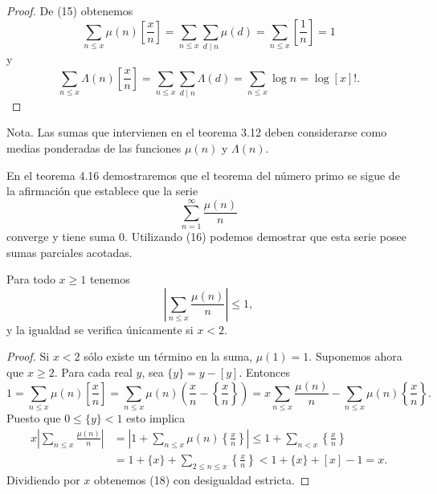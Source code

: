 \documentclass[12pt,a4paper]{book}
\begin{document}
    \begin{proof}
        De (15) obtenemos
        \begin{equation*}
            \sum_{n\leq x}\mu(n)\left[\frac{x}{n}\right]=\sum_{n\leq x}\sum_{d\mid n}\mu(d)
            =\sum_{n\leq x}\left[\frac{1}{n}\right]=1
        \end{equation*}
        y
        \begin{equation*}
            \sum_{n\leq x}\Lambda(n)\left[\frac{x}{n}\right]=\sum_{n\leq x}\sum_{d\mid n}\Lambda(d)
            =\sum_{n\leq x}\log n=\log[x]!.
        \end{equation*}
    \end{proof}

    Nota. Las sumas que intervienen en el teorema 3.12 deben considerarse como medias
    ponderadas de las funciones $\mu(n)$ y $\Lambda(n)$.

    En el teorema 4.16 demostraremos que el teorema del número primo se sigue de la
    afirmación que establece que la serie
    \begin{equation*}
        \sum_{n=1}^{\infty}\frac{\mu(n)}{n}
    \end{equation*}
    converge y tiene suma 0. Utilizando (16) podemos demostrar que esta serie posee sumas
    parciales acotadas.

    \begin{teorema}
        Para todo $x\geq1$ tenemos
        \begin{equation}
            \left|\sum_{n\leq x}\frac{\mu(n)}{n}\right|\leq1,
        \end{equation}
        y la igualdad se verifica únicamente si $x<2$.
    \end{teorema}

    \begin{proof}
        Si $x<2$ sólo existe un término en la suma, $\mu(1)=1$. Suponemos ahora que
        $x\geq2$. Para cada real $y$, sea $\{y\}=y-[y]$. Entonces
        \begin{equation*}
            1=\sum_{n\leq x}\mu(n)\left[\frac{x}{n}\right]
            =\sum_{n\leq x}\mu(n)\left(\frac{x}{n}-\left\{\frac{x}{n}\right\}\right)
            =x\sum_{n\leq x}\frac{\mu(n)}{n}-\sum_{n\leq x}\mu(n)\left\{\frac{x}{n}\right\}.
        \end{equation*}
        Puesto que $0\leq\{y\}<1$ esto implica
        \begin{align*}
            x\left|\sum_{n\leq x}\frac{\mu(n)}{n}\right|&=\left|1+\sum_{n\leq x}\mu(n)\left\{\frac{x}{n}\right\}\right|
            \leq1+\sum_{n<x}\left\{\frac{x}{n}\right\}\\
            &=1+\{x\}+\sum_{2\leq n\leq x}\left\{\frac{x}{n}\right\}<1+\{x\}+[x]-1=x.
        \end{align*}
        Dividiendo por $x$ obtenemos (18) con desigualdad estricta.
    \end{proof}
\end{document}
